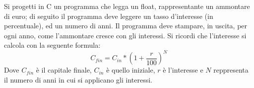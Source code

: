 \begin{Exercise}[label={ex:interessi}]
  Si progetti in C un programma che legga un float, rappresentante un ammontare di euro; di seguito il programma deve leggere un tasso d'interesse (in percentuale), ed un numero di anni. Il programma deve stampare, in uscita, per ogni anno, come l'ammontare cresce con gli interessi. Si ricordi che l'interesse si calcola con la seguente formula:
  $$
    C_{fin} = C_{in} * \left(1+\frac{r}{100}\right)^N
  $$
  Dove $C_{fin}$ è il capitale finale, $C_{in}$ è quello iniziale, $r$ è l'interesse e $N$ reppresenta il numero di anni in cui si applicano gli interessi.
\end{Exercise}

\begin{Answer}[ref={ex:interessi}]
  
\end{Answer}
